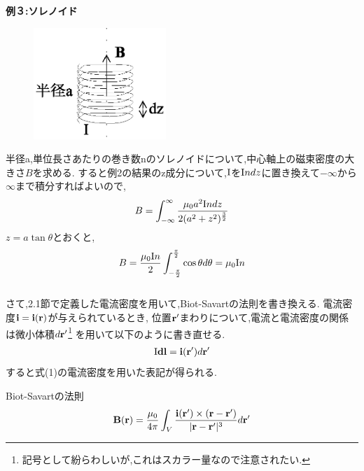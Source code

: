 \documentclass[../main]{subfiles}
\begin{document}
\newpage
{\bf 例３:ソレノイド} \\
\begin{figure}[htbp]
 \begin{center}
  \includegraphics[width=50mm]{8.5.eps}
 \end{center}
 \caption{}
 \label{fig:five}
\end{figure}
半径a,単位長さあたりの巻き数nのソレノイドについて,中心軸上の磁束密度の大きさ$B$を求める.
すると例2の結果のz成分について,${\rm I}$を${\rm I}ndz$に置き換えて$-\infty$から$\infty$まで積分すればよいので,
\begin{eqnarray*}
B=\int_{-\infty}^{\infty} \frac{\mu_0 a^2  {\rm I}ndz  }{2 (a^2+z^2)^{\frac{3}{2}} }
\end{eqnarray*}
$z=a\tan\theta$とおくと,
\begin{eqnarray*}
B= \frac{\mu_0 {\rm I}n}{2} \int_{-\frac{\pi}{2}}^{\frac{\pi}{2}} \cos \theta d\theta = \mu_0 {\rm I}n
\end{eqnarray*}
\\
さて,2.1節で定義した電流密度を用いて,Biot-Savartの法則を書き換える.
電流密度${\bf i}={\bf i}({\bf r})$が与えられているとき,
位置${\bf r'}$まわりについて,電流と電流密度の関係は微小体積$d{\bf r'}$\footnote{記号として紛らわしいが,これはスカラー量なので注意されたい.}
を用いて以下のように書き直せる.
\begin{eqnarray*}
{\rm I}{\bf dl} = {\bf i}({\bf r'})d{\bf r'}
\end{eqnarray*}
すると式(1)の電流密度を用いた表記が得られる.
\begin{itembox}[c]{Biot-Savartの法則}
\begin{eqnarray}
{\bf B}({\bf r})=\frac{\mu_0}{4 \pi} \int_{V}^{}\frac{{\bf i}({\bf r'}) \times ({\bf r}-{\bf r'})}{|{\bf r}-{\bf r'}|^3} d{\bf r'}
\end{eqnarray}
\end{itembox}
\end{document}
